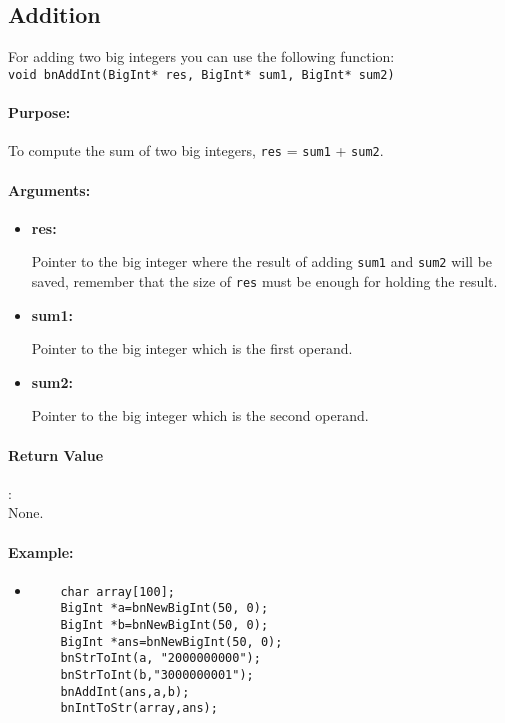\documentclass{book}
\begin{document}
\subsection{Addition}

For adding two big integers you can use the following function:\\

\verb+void bnAddInt(BigInt* res, BigInt* sum1, BigInt* sum2)+\\

\paragraph{Purpose:} 

To compute the sum of two big integers, \verb+res+ = \verb+sum1+ + \verb+sum2+.

\paragraph{Arguments:}

\begin{itemize}
\item{\bf res:}

Pointer to the big integer where the result of adding \verb+sum1+ and \verb+sum2+ will be saved, remember that the size of \verb+res+ must be enough for holding the result.

\item {\bf sum1:}

Pointer to the big integer which is the first operand.

\item {\bf sum2:}

Pointer to the big integer which is the second operand.

\end{itemize}

\paragraph{Return Value}:\\

None.

\paragraph{Example:}

\begin{itemize}
\item
\begin{verbatim}
    char array[100];
    BigInt *a=bnNewBigInt(50, 0);
    BigInt *b=bnNewBigInt(50, 0);
    BigInt *ans=bnNewBigInt(50, 0);
    bnStrToInt(a, "2000000000");
    bnStrToInt(b,"3000000001");
    bnAddInt(ans,a,b);
    bnIntToStr(array,ans);
\end{verbatim}
\end{itemize}
\end{document}
